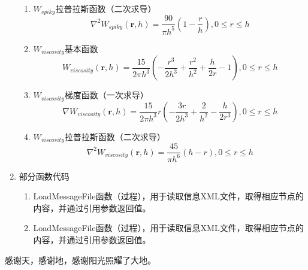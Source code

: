 \documentclass[printMode=false, declarePage=true]{ecnuthesis}
\begin{document}
\begin{appendix}
\begin{enumerate}
\begin{enumerate}
        \item $W_{spiky}$拉普拉斯函数（二次求导）
            \begin{equation}
                \nabla^2 W_{spiky}(\mathbf{r},h) = \frac{90}{\pi h^5}(1-\frac{r}{h}),0\le r \le h 
                \label{con:spiky_3}
            \end{equation}
        \item $W_{viscosity}$基本函数
            \begin{equation}
                W_{viscosity}(\mathbf{r},h) = \frac{15}{2\pi h^3} (-\frac{r^3}{2h^3}+\frac{r^2}{h^2}+\frac{h}{2r}-1),0\le r \le h 
                \label{con:viskernel_1}
            \end{equation}
        \item $W_{viscosity}$梯度函数（一次求导）
            \begin{equation}
                \nabla W_{viscosity}(\mathbf{r},h) = \frac{15}{2\pi h^3} r(-\frac{3r}{2h^3}+\frac{2}{h^2}-\frac{h}{2r^3}),0\le r \le h 
                \label{con:viskernel_2}
            \end{equation}
        \item $W_{viscosity}$拉普拉斯函数（二次求导）
            \begin{equation}
                \nabla^2 W_{viscosity}(\mathbf{r},h) = \frac{45}{\pi h^6} (h-r),0\le r \le h 
                \label{con:viskernel_3}
            \end{equation}

    \end{enumerate}
    
    \item 部分函数代码
    \begin{enumerate}
      \item LoadMessageFile函数（过程），用于读取信息XML文件，取得相应节点的内容，并通过引用参数返回值。
      \item LoadMessageFile函数（过程），用于读取信息XML文件，取得相应节点的内容，并通过引用参数返回值。
    \end{enumerate}
  \end{enumerate}
\end{appendix}

\begin{acknowledgement}
  感谢天，感谢地，感谢阳光照耀了大地。
\end{acknowledgement}
\end{document}
